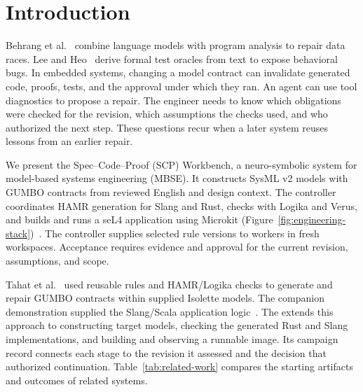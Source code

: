 \section{Introduction}
\label{sec:introduction}

Behrang et al.~\cite{behrang2025drfix} combine language models with program analysis to repair data races. Lee and Heo~\cite{lee2026expecto} derive formal test oracles from text to expose behavioral bugs. In embedded systems, changing a model contract can invalidate generated code, proofs, tests, and the approval under which they ran. An agent can use tool diagnostics to propose a repair. The engineer needs to know which obligations were checked for the revision, which assumptions the checks used, and who authorized the next step. These questions recur when a later system reuses lessons from an earlier repair.

We present the Spec--Code--Proof (SCP) Workbench, a neuro-symbolic system for model-based systems engineering (MBSE). It constructs SysML v2 models with GUMBO contracts from reviewed English and design context. The controller coordinates HAMR generation for Slang and Rust, checks with Logika and Verus, and builds and runs a seL4 application using Microkit (Figure~\ref{fig:engineering-stack})~\cite{inspectaProject,hardin2025dasc,hamrTutorials2026}. The controller supplies selected rule versions to workers in fresh workspaces. Acceptance requires evidence and approval for the current revision, assumptions, and scope.

Tahat et al.~\cite{tahat2026scp} used reusable rules and HAMR/Logika checks to generate and repair GUMBO contracts within supplied Isolette models. The companion demonstration supplied the Slang/Scala application logic~\cite{inspecta_repo}. The \workbench{} extends this approach to constructing target models, checking the generated Rust and Slang implementations, and building and observing a runnable image. Its campaign record connects each stage to the revision it assessed and the decision that authorized continuation. Table~\ref{tab:related-work} compares the starting artifacts and outcomes of related systems.

